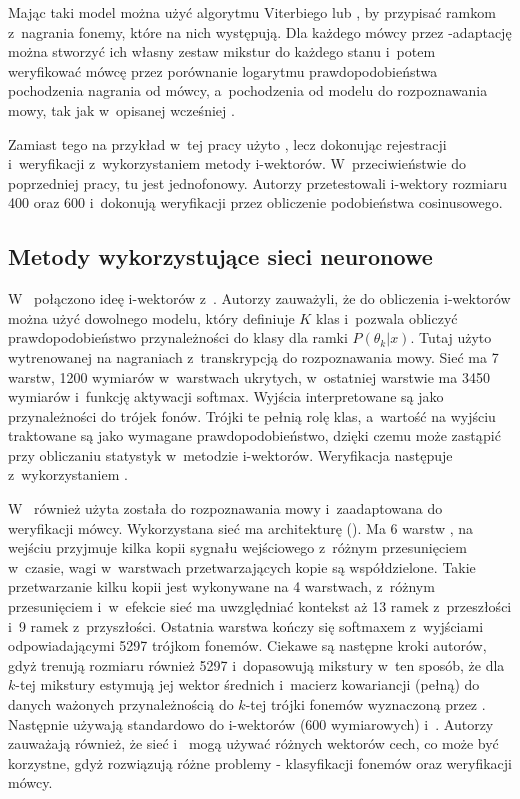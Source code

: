 Mając taki model można użyć algorytmu Viterbiego lub , by przypisać ramkom z~nagrania
fonemy, które na nich występują. Dla każdego mówcy
przez -adaptację można stworzyć ich własny zestaw mikstur do każdego stanu i~potem weryfikować
mówcę przez porównanie logarytmu prawdopodobieństwa
pochodzenia nagrania od mówcy, a~pochodzenia od modelu do rozpoznawania mowy, tak jak
w~opisanej wcześniej .

Zamiast tego na przykład w~tej pracy \cite{iVectorHmmBased}
użyto , lecz dokonując rejestracji i~weryfikacji z~wykorzystaniem metody i-wektorów.
W~przeciwieństwie do poprzedniej pracy, tu  jest jednofonowy. Autorzy przetestowali
i-wektory rozmiaru 400 oraz 600 i~dokonują weryfikacji przez obliczenie podobieństwa cosinusowego.

\subsection{Metody wykorzystujące sieci neuronowe}

W~\cite{aNovelSchemeFor}
połączono ideę i-wektorów z~. Autorzy zauważyli, że do obliczenia i-wektorów można użyć
dowolnego modelu, który definiuje $K$ klas i~pozwala obliczyć prawdopodobieństwo
przynależności do klasy dla ramki $P(\theta_k | x)$.
Tutaj użyto  wytrenowanej na nagraniach z~transkrypcją do rozpoznawania mowy.
Sieć ma 7 warstw, 1200 wymiarów w~warstwach ukrytych, w~ostatniej warstwie ma 3450 wymiarów i~funkcję aktywacji softmax.
Wyjścia interpretowane są jako przynależności do trójek fonów. Trójki te pełnią rolę klas,
a~wartość na wyjściu traktowane są jako wymagane prawdopodobieństwo, dzięki czemu 
może zastąpić 
przy obliczaniu statystyk w~metodzie i-wektorów. Weryfikacja następuje z~wykorzystaniem .

W~\cite{timeDelayDeep}
również użyta została  do rozpoznawania mowy i~zaadaptowana do weryfikacji mówcy.
Wykorzystana sieć ma architekturę  (). Ma 6 warstw ,
na wejściu przyjmuje kilka kopii sygnału wejściowego z~różnym przesunięciem w~czasie, wagi
w~warstwach przetwarzających kopie są współdzielone. Takie przetwarzanie kilku kopii jest wykonywane na
4 warstwach, z~różnym przesunięciem i~w~efekcie sieć ma uwzględniać kontekst aż 13 ramek
z~przeszłości i~9 ramek z~przyszłości. Ostatnia warstwa kończy się softmaxem z~wyjściami odpowiadającymi 5297 trójkom fonemów.
Ciekawe są następne kroki autorów, gdyż trenują  rozmiaru również 5297
i~dopasowują mikstury w~ten sposób, że dla $k$-tej mikstury estymują jej wektor średnich i~macierz kowariancji (pełną)
do danych ważonych przynależnością do $k$-tej trójki fonemów wyznaczoną przez .
Następnie używają  standardowo do i-wektorów (600 wymiarowych) i~.
Autorzy zauważają również, że sieć i~ mogą używać różnych wektorów cech,
co może być korzystne, gdyż rozwiązują różne problemy - klasyfikacji fonemów oraz weryfikacji mówcy.

